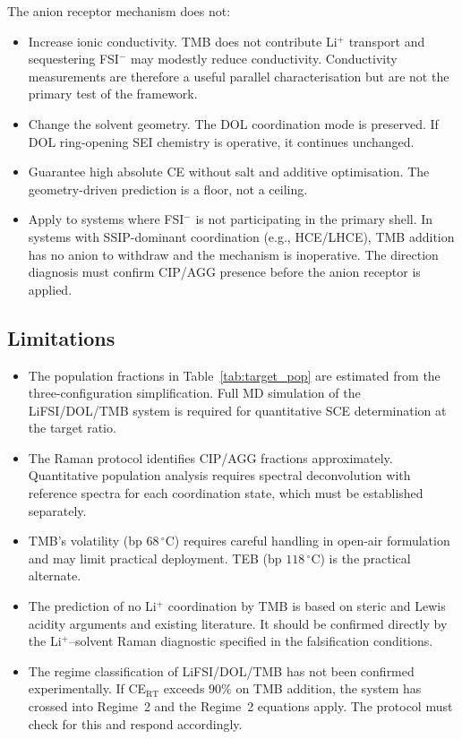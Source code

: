 \documentclass[11pt]{article}
\theoremstyle{plain}
\theoremstyle{definition}
\theoremstyle{remark}
\begin{document}
The anion receptor mechanism does not:
\begin{itemize}[leftmargin=2em]
  \item Increase ionic conductivity.  TMB does not contribute Li$^+$
        transport and sequestering FSI$^-$ may modestly reduce
        conductivity.  Conductivity measurements are therefore a useful
        parallel characterisation but are not the primary test of the
        framework.
  \item Change the solvent geometry.  The DOL coordination mode is
        preserved.  If DOL ring-opening SEI chemistry is operative,
        it continues unchanged.
  \item Guarantee high absolute CE without salt and additive
        optimisation.  The geometry-driven prediction is a floor, not
        a ceiling.
  \item Apply to systems where FSI$^-$ is not participating in the
        primary shell.  In systems with SSIP-dominant coordination
        (e.g., HCE/LHCE), TMB addition has no anion to withdraw and
        the mechanism is inoperative.  The direction diagnosis must
        confirm CIP/AGG presence before the anion receptor is applied.
\end{itemize}

\subsection{Limitations}

\begin{itemize}[leftmargin=2em]
  \item The population fractions in Table~\ref{tab:target_pop} are
        estimated from the three-configuration simplification.
        Full MD simulation of the LiFSI/DOL/TMB system is required
        for quantitative SCE determination at the target ratio.
  \item The Raman protocol identifies CIP/AGG fractions approximately.
        Quantitative population analysis requires spectral
        deconvolution with reference spectra for each coordination
        state, which must be established separately.
  \item TMB's volatility (bp $68\,^\circ$C) requires careful handling
        in open-air formulation and may limit practical deployment.
        TEB (bp $118\,^\circ$C) is the practical alternate.
  \item The prediction of no Li$^+$ coordination by TMB is based on
        steric and Lewis acidity arguments and existing literature.
        It should be confirmed directly by the Li$^+$--solvent Raman
        diagnostic specified in the falsification conditions.
  \item The regime classification of LiFSI/DOL/TMB has not been
        confirmed experimentally.  If CE$_\mathrm{RT}$ exceeds $90\%$
        on TMB addition, the system has crossed into Regime~2 and the
        Regime~2 equations apply.  The protocol must check for this
        and respond accordingly.
\end{itemize}
\end{document}
